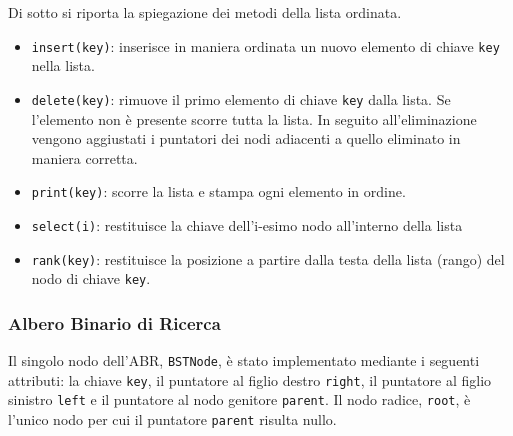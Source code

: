 Di sotto si riporta la spiegazione dei metodi della lista ordinata.
\begin{itemize}
	\item \texttt{insert(key)}: inserisce in maniera ordinata un nuovo elemento di chiave \texttt{key} nella lista.
	\item \texttt{delete(key)}: rimuove il primo elemento di chiave \texttt{key} dalla lista. Se l'elemento non è presente scorre tutta la lista. In seguito all'eliminazione vengono aggiustati i puntatori dei nodi adiacenti a quello eliminato in maniera corretta.
	\item \texttt{print(key)}: scorre la lista e stampa ogni elemento in ordine.
	\item \texttt{select(i)}: restituisce la chiave dell'i-esimo nodo all'interno della lista
	\item \texttt{rank(key)}: restituisce la posizione a partire dalla testa della lista (rango) del nodo di chiave \texttt{key}.
\end{itemize} 

\subsubsection*{Albero Binario di Ricerca}
Il singolo nodo dell’ABR, \texttt{BSTNode}, è stato implementato mediante i seguenti attributi: la chiave \texttt{key}, il puntatore al figlio destro \texttt{right}, il puntatore al figlio sinistro \texttt{left} e il puntatore al nodo genitore \texttt{parent}. Il nodo radice, \texttt{root}, è l’unico nodo per cui il puntatore \texttt{parent} risulta nullo.


